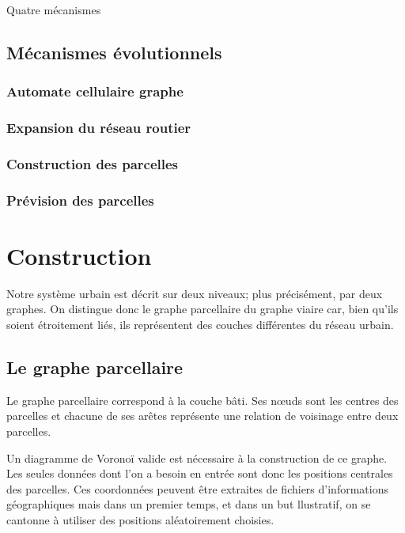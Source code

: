 \documentclass[10pt]{article}
\begin{document}
Quatre mécanismes

\subsection{Mécanismes évolutionnels}

\subsubsection{Automate cellulaire graphe}

\subsubsection{Expansion du réseau routier}

\subsubsection{Construction des parcelles}

\subsubsection{Prévision des parcelles}

\section{Construction}

Notre système urbain est décrit sur deux niveaux; plus précisément,
par deux graphes. On distingue donc le graphe parcellaire du graphe
viaire car, bien qu'ils soient étroitement liés, ils représentent des
couches différentes du réseau urbain.

\subsection{Le graphe parcellaire}

Le graphe parcellaire correspond à la couche bâti. Ses n\oe uds sont
les centres des parcelles et chacune de ses arêtes représente une
relation de voisinage entre deux parcelles.

Un diagramme de Voronoï valide est nécessaire à la construction de ce
graphe. Les seules données dont l'on a besoin en entrée sont donc les
positions centrales des parcelles. Ces coordonnées peuvent être
extraites de fichiers d'informations géographiques mais dans un
premier temps, et dans un but llustratif, on se cantonne à utiliser
des positions aléatoirement choisies.
\end{document}
